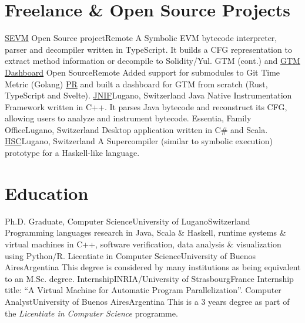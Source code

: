 \documentclass[11pt,a4paper,sans]{moderncv}
\begin{document}
\section{Freelance \& Open Source Projects}
    {\href{https://github.com/acuarica/evm}{SEVM} Open Source project}{Remote}{}
    {A Symbolic EVM bytecode interpreter, parser and decompiler written in TypeScript. It builds a CFG representation to extract method information or decompile to Solidity/Yul.}
    {GTM (cont.) and \href{https://github.com/acuarica/gtm-web}{GTM Dashboard} Open Source}{Remote}{}
    {Added support for submodules to Git Time Metric (Golang) \href{https://github.com/git-time-metric/gtm/pull/85}{PR} and built a dashboard for GTM from scratch (Rust, TypeScript and Svelte).}
    {\href{https://github.com/acuarica/jnif}{JNIF}}{Lugano, Switzerland}{}
    {Java Native Instrumentation Framework written in C++. It parses Java bytecode and reconstruct its CFG, allowing users to analyze and instrument bytecode.}
    {Essentia, Family Office}{Lugano, Switzerland}{}
    {Desktop application written in C\# and Scala.}
    {\href{https://github.com/acuarica/hsc}{HSC}}{Lugano, Switzerland}{}
    {A Supercompiler (similar to symbolic execution) prototype for a Haskell-like language.}

\section{Education}
    {Ph.D. Graduate, Computer Science}{University of Lugano}{Switzerland}{}
    {Programming languages research in Java, Scala \& Haskell, runtime systems \& virtual machines in C++, software verification, data analysis \& visualization using Python/R.}
    {Licentiate in Computer Science}{University of Buenos Aires}{Argentina}{}
    {This degree is considered by many institutions as being equivalent to an M.Sc. degree.}
    {Internship}{INRIA/University of Strasbourg}{France}{}
    {Internship title: ``A Virtual Machine for Automatic Program Parallelization''.}
    {Computer Analyst}{University of Buenos Aires}{Argentina}{}
    {This is a 3 years degree as part of the \emph{Licentiate in Computer Science} programme.}
\end{document}
